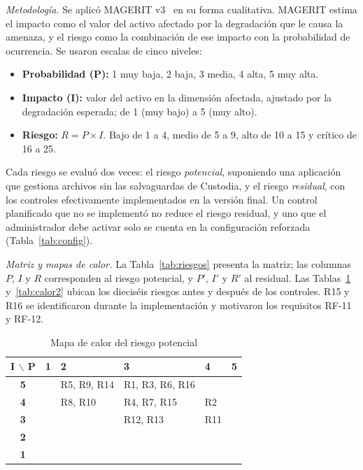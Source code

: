 \documentclass[conference]{IEEEtran}
\newcommand{\B}{\cellcolor{rbajo}}
\newcommand{\M}{\cellcolor{rmedio}}
\newcommand{\A}{\cellcolor{ralto}}
\newcommand{\C}{\cellcolor{rcritico}}
\renewcommand{\arraystretch}{1.15}
\begin{document}
\textit{Metodología.} Se aplicó MAGERIT v3~\cite{magerit1} en su forma cualitativa. MAGERIT estima el impacto como el valor del activo afectado por la degradación que le causa la amenaza, y el riesgo como la combinación de ese impacto con la probabilidad de ocurrencia. Se usaron escalas de cinco niveles:
\begin{itemize}
    \item \textbf{Probabilidad (P):} 1 muy baja, 2 baja, 3 media, 4 alta, 5 muy alta.
    \item \textbf{Impacto (I):} valor del activo en la dimensión afectada, ajustado por la degradación esperada; de 1 (muy bajo) a 5 (muy alto).
    \item \textbf{Riesgo:} $R = P \times I$. Bajo de 1 a 4, medio de 5 a 9, alto de 10 a 15 y crítico de 16 a 25.
\end{itemize}
Cada riesgo se evaluó dos veces: el riesgo \textit{potencial}, suponiendo una aplicación que gestiona archivos sin las salvaguardas de Custodia, y el riesgo \textit{residual}, con los controles efectivamente implementados en la versión final. Un control planificado que no se implementó no reduce el riesgo residual, y uno que el administrador debe activar solo se cuenta en la configuración reforzada (Tabla~\ref{tab:config}).

\textit{Matriz y mapas de calor.} La Tabla~\ref{tab:riesgos} presenta la matriz; las columnas $P$, $I$ y $R$ corresponden al riesgo potencial, y $P'$, $I'$ y $R'$ al residual. Las Tablas~\ref{tab:calor1} y~\ref{tab:calor2} ubican los dieciséis riesgos antes y después de los controles. R15 y R16 se identificaron durante la implementación y motivaron los requisitos RF-11 y RF-12.

\begin{table}[!htb]
\caption{Mapa de calor del riesgo potencial}
\label{tab:calor1}
\centering
\footnotesize
\setlength{\tabcolsep}{2pt}
\renewcommand{\arraystretch}{1.5}
\begin{tabular}{|c|>{\centering\arraybackslash}p{1.25cm}|>{\centering\arraybackslash}p{1.25cm}|>{\centering\arraybackslash}p{1.25cm}|>{\centering\arraybackslash}p{1.25cm}|>{\centering\arraybackslash}p{1.25cm}|}
\hline
\textbf{I $\backslash$ P} & \textbf{1} & \textbf{2} & \textbf{3} & \textbf{4} & \textbf{5} \\
\hline
\textbf{5}\rule[-2.4ex]{0pt}{6ex} & \M & \A R5, R9, R14 & \A R1, R3, R6, R16 & \C & \C \\
\hline
\textbf{4}\rule[-2.4ex]{0pt}{6ex} & \B & \M R8, R10 & \A R4, R7, R15 & \C R2 & \C \\
\hline
\textbf{3}\rule[-2.4ex]{0pt}{6ex} & \B & \M & \M R12, R13 & \A R11 & \A \\
\hline
\textbf{2}\rule[-2.4ex]{0pt}{6ex} & \B & \B & \M & \M & \A \\
\hline
\textbf{1}\rule[-2.4ex]{0pt}{6ex} & \B & \B & \B & \B & \M \\
\hline
\end{tabular}

\end{table}
\end{document}
